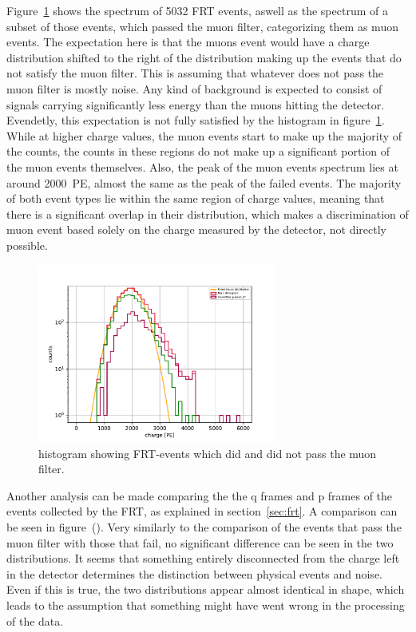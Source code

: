 Figure~\ref{fig:frt_mu_2} shows the spectrum of \num{5032} FRT events, aswell as the spectrum of a subset of those events, which passed the muon filter, categorizing 
them as muon events. The expectation here is that the muons event would have a charge distribution shifted to the right of the distribution making up the events 
that do not satisfy the muon filter. This is assuming that whatever does not pass the muon filter is mostly noise. Any kind of background is expected to consist
of signals carrying significantly less energy than the muons hitting the detector. Evendetly, this expectation is not fully satisfied by the histogram in 
figure~\ref{fig:frt_mu_2}. While at higher charge values, the muon events start to make up the majority of the counts, the counts in these regions do not make up 
a significant portion of the muon events themselves. Also, the peak of the muon events spectrum lies at around \num{2000}~PE, almost the same as the peak of the 
failed events. The majority of both event types lie within the same region of charge values, meaning that there is a significant overlap in their distribution, 
which makes a discrimination of muon event based solely on the charge measured by the detector, not directly possible. 
\begin{figure}
    \centering
    \includegraphics[width=0.7\textwidth]{Plots/frt_muon_filter.pdf}
    \caption{histogram showing FRT-events which did and did not pass the muon filter.}
    \label{fig:frt_mu_2}
\end{figure}

Another analysis can be made comparing the the q frames and p frames of the events collected by the FRT, as explained in section~\ref{sec:frt}. A comparison can be seen in 
figure~(). Very similarly to the comparison of the events that pass the muon filter with those that fail, no significant difference can be seen in the two distributions. 
It seems that something entirely disconnected from the charge left in the detector determines the distinction between physical events and noise. Even if this is true, 
the two distributions appear almost identical in shape, which leads to the assumption that something might have went wrong in the processing of the data. 

